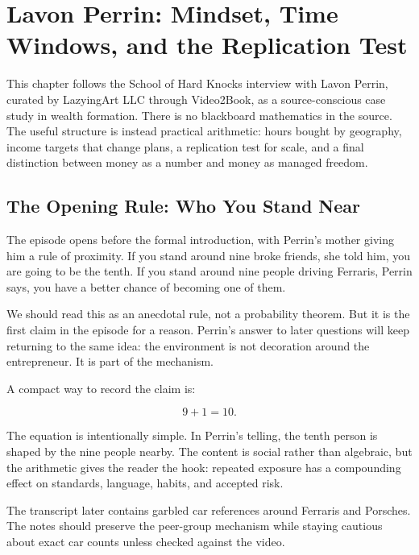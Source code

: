 \chapter{Lavon Perrin: Mindset, Time Windows, and the Replication Test}

This chapter follows the School of Hard Knocks interview with Lavon Perrin, curated by LazyingArt LLC through Video2Book, as a source-conscious case study in wealth formation. There is no blackboard mathematics in the source. The useful structure is instead practical arithmetic: hours bought by geography, income targets that change plans, a replication test for scale, and a final distinction between money as a number and money as managed freedom.

\section{The Opening Rule: Who You Stand Near}

The episode opens before the formal introduction, with Perrin's mother giving him a rule of proximity. If you stand around nine broke friends, she told him, you are going to be the tenth. If you stand around nine people driving Ferraris, Perrin says, you have a better chance of becoming one of them.

We should read this as an anecdotal rule, not a probability theorem. But it is the first claim in the episode for a reason. Perrin's answer to later questions will keep returning to the same idea: the environment is not decoration around the entrepreneur. It is part of the mechanism.

A compact way to record the claim is:

\begin{equation}
9+1=10.
\end{equation}

The equation is intentionally simple. In Perrin's telling, the tenth person is shaped by the nine people nearby. The content is social rather than algebraic, but the arithmetic gives the reader the hook: repeated exposure has a compounding effect on standards, language, habits, and accepted risk.

\begin{remark}
The transcript later contains garbled car references around Ferraris and Porsches. The notes should preserve the peer-group mechanism while staying cautious about exact car counts unless checked against the video.
\end{remark}

